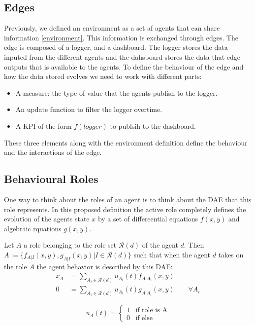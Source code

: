 \subsection{Edges}

Previously, we defined an environment as a set af agents that can share information \ref{environment}. This information is exchanged through edges. The edge is composed of a logger, and a dashboard. The logger stores the data inputed from the different agents and the dahsboard stores the data that edge outputs that is available to the agents. To define the behaviour of the edge and how the data stored evolves we need to work with different parts:

\begin{itemize}
    \item A measure: the type of value that the agents publish to the logger.
    \item An update function to filter the logger overtime.
    \item A KPI of the form $f(logger)$ to publsih to the dashboard.
\end{itemize}

These three elements along with the environment definition define the behaviour and the interactions of the edge. 

\subsection{Behavioural Roles}

One way to think about the roles of an agent is to think about the DAE that this role represents. In this proposed definition the active role completely defines the evolution of the agents state $x$ by a set of differeential equations $f(x,y)$ and algebraic rquations $g(x,y)$.
\begin{definition}
    Let $A$ a role belonging to the role set $\mathcal{R}(d)$ of the agent $d$. Then $A := \{ f_{A|I}(x,y), g_{A|I}(x,y) | I \in  \mathcal{R}(d)\} $ such that when the agent $d$ takes on the role $A$ the agent behavior is described by this DAE:
    \begin{align}
        \dot{x}_{A} &= \sum_{A_i \in \mathcal{R}(d)} u_{A_i}(t) f_{A|A_i}(x,y)\\
        0 &= \sum_{A_i \in \mathcal{R}(d)} u_{A_i}(t) g_{A|A_i}(x,y) \qquad \forall A_i
    \end{align}

    \begin{equation}
        u_A(t) = \begin{cases}
            1 & \text{if role is A} \\
            0 & \text{if else} 
        \end{cases}
    \end{equation}
\end{definition}

